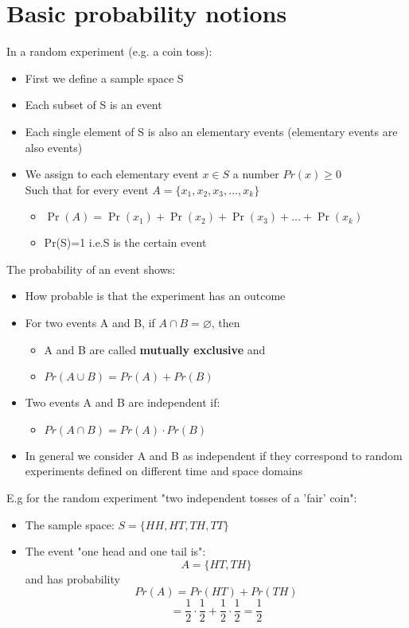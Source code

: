 \documentclass{article}[18pt]
\begin{document}
\section{Basic probability notions}
In a random experiment (e.g. a coin toss):
\begin{itemize}
	\item First we define a sample space S
	\item Each subset of S is an event
	\item Each single element of S is also an elementary events (elementary events are also events)
	\item We assign to each elementary event $x\in S$ a number $Pr(x)\geqslant 0$\\
	Such that for every event $A=\{x_1,x_2,x_3,...,x_k\}$
	\begin{itemize}
		\item $\operatorname { Pr } ( A ) = \operatorname { Pr } \left( x _ { 1 } \right) + \operatorname { Pr } \left( x _ { 2 } \right) + \operatorname { Pr } \left( x _ { 3 } \right) + \ldots + \operatorname { Pr } \left( x _ { k } \right)$
		\item Pr(S)=1 i.e.S is the certain event
	\end{itemize}
\end{itemize}
The probability of an event shows:
\begin{itemize}
	\item How probable is that the experiment has an outcome
	\item For two events A and B, if $A\cap B=\varnothing$, then
	\begin{itemize}
		\item A and B are called \textbf{mutually exclusive} and
		\item $Pr(A\cup B)=Pr(A)+Pr(B)$
	\end{itemize}
	\item Two events A and B are independent if:
	\begin{itemize}
		\item $Pr(A\cap B)=Pr(A)\cdot Pr(B)$
	\end{itemize}
	\item In general we consider A and B as independent if they correspond to random experiments defined on different time and space domains
\end{itemize}
E.g for the random experiment "two independent tosses of a 'fair' coin":
\begin{itemize}
	\item The sample space: $S = \{ H H , H T , T H , T T \}$
	\item The event "one head and one tail is":
	$$A=\{HT,TH\}$$
and has probability
$$Pr(A)=Pr(HT)+Pr(TH)$$
$$=\frac{1}{2}\cdot \frac{1}{2} +\frac{1}{2}\cdot \frac{1}{2}=\frac{1}{2}$$
\end{itemize}
\end{document}
